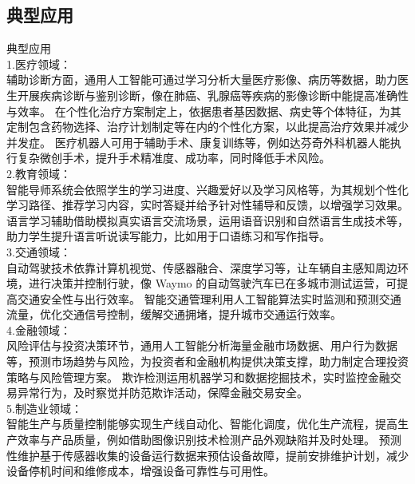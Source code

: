 \documentclass[supercite]{Experimental_Report}
\theoremstyle{definition}
\begin{document}
	\subsection{典型应用}
	典型应用\\
	1.医疗领域：\\
	辅助诊断方面，通用人工智能可通过学习分析大量医疗影像、病历等数据，助力医生开展疾病诊断与鉴别诊断，像在肺癌、乳腺癌等疾病的影像诊断中能提高准确性与效率。
	在个性化治疗方案制定上，依据患者基因数据、病史等个体特征，为其定制包含药物选择、治疗计划制定等在内的个性化方案，以此提高治疗效果并减少并发症。
	医疗机器人可用于辅助手术、康复训练等，例如达芬奇外科机器人能执行复杂微创手术，提升手术精准度、成功率，同时降低手术风险。\\
	2.教育领域：\\
	智能导师系统会依照学生的学习进度、兴趣爱好以及学习风格等，为其规划个性化学习路径、推荐学习内容，实时答疑并给予针对性辅导和反馈，以增强学习效果。
	语言学习辅助借助模拟真实语言交流场景，运用语音识别和自然语言生成技术等，助力学生提升语言听说读写能力，比如用于口语练习和写作指导。\\
	3.交通领域：\\
	自动驾驶技术依靠计算机视觉、传感器融合、深度学习等，让车辆自主感知周边环境，进行决策并控制行驶，像 Waymo 的自动驾驶汽车已在多城市测试运营，可提高交通安全性与出行效率。
	智能交通管理利用人工智能算法实时监测和预测交通流量，优化交通信号控制，缓解交通拥堵，提升城市交通运行效率。\\
	4.金融领域：\\
	风险评估与投资决策环节，通用人工智能分析海量金融市场数据、用户行为数据等，预测市场趋势与风险，为投资者和金融机构提供决策支撑，助力制定合理投资策略与风险管理方案。
	欺诈检测运用机器学习和数据挖掘技术，实时监控金融交易异常行为，及时察觉并防范欺诈活动，保障金融交易安全。\\
	5.制造业领域：\\
	智能生产与质量控制能够实现生产线自动化、智能化调度，优化生产流程，提高生产效率与产品质量，例如借助图像识别技术检测产品外观缺陷并及时处理。
	预测性维护基于传感器收集的设备运行数据来预估设备故障，提前安排维护计划，减少设备停机时间和维修成本，增强设备可靠性与可用性。
	
\end{document}
